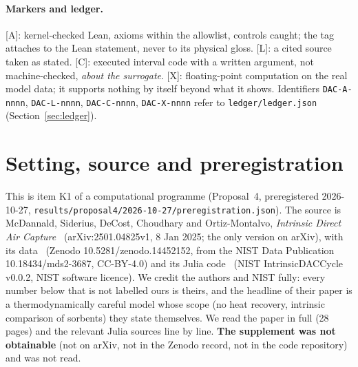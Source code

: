 \documentclass[10pt]{article}
\newcommand{\tier}[1]{\textsf{[#1]}}
\newcommand{\tA}{\tier{A}}
\newcommand{\tL}{\tier{L}}
\newcommand{\tC}{\tier{C}}
\newcommand{\tX}{\tier{X}}
\newcommand{\id}[1]{\texttt{DAC-#1}}
\begin{document}
\paragraph{Markers and ledger.} \tA{}: kernel-checked Lean, axioms within the allowlist, controls caught; the tag attaches to the Lean statement, never to its physical gloss.
\tL{}: a cited source taken as stated. \tC{}: executed interval code with a written argument, not machine-checked, \emph{about the surrogate}.
\tX{}: floating-point computation on the real model data; it supports nothing by itself beyond what it shows. Identifiers \id{A-nnnn}, \id{L-nnnn}, \id{C-nnnn}, \id{X-nnnn} refer to
\texttt{ledger/ledger.json} (Section~\ref{sec:ledger}).

\section{Setting, source and preregistration}\label{sec:setting}
This is item K1 of a computational programme (Proposal~4, preregistered 2026-10-27, \texttt{results/proposal4/2026-10-27/preregistration.json}).
The source is McDannald, Siderius, DeCost, Choudhary and Ortiz-Montalvo, \emph{Intrinsic Direct Air Capture}~\cite{mcd}
(arXiv:2501.04825v1, 8 Jan 2025; the only version on arXiv), with its data~\cite{zen} (Zenodo 10.5281/zenodo.14452152, from the NIST Data Publication
10.18434/mds2-3687, CC-BY-4.0) and its Julia code~\cite{nist} (NIST IntrinsicDACCycle v0.0.2, NIST software licence). We credit the authors and NIST fully:
every number below that is not labelled ours is theirs, and the headline of their paper is a thermodynamically careful model whose scope
(no heat recovery, intrinsic comparison of sorbents) they state themselves. We read the paper in full (28 pages) and
the relevant Julia sources line by line. \textbf{The supplement was not obtainable} (not on arXiv, not in the Zenodo record, not in the code repository) and was not read.
\end{document}

